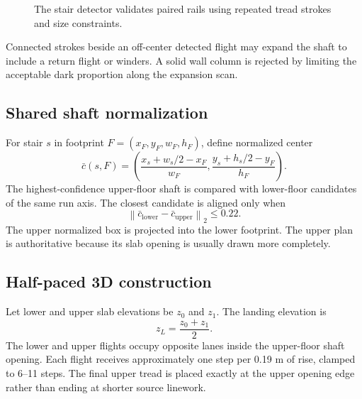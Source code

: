 \documentclass[11pt,a4paper]{article}
\newcommand{\norm}[1]{\left\lVert #1\right\rVert}
\begin{document}
\begin{figure}[htbp]
\centering
{}
\caption{The stair detector validates paired rails using repeated tread strokes and size constraints.}
\label{fig:stairdetect}
\end{figure}

Connected strokes beside an off-center detected flight may expand the shaft to include a return flight or winders. A solid wall column is rejected by limiting the acceptable dark proportion along the expansion scan.

\subsection{Shared shaft normalization}

For stair $s$ in footprint $F=(x_F,y_F,w_F,h_F)$, define normalized center
\begin{equation}
\bar c(s,F)=\left(\frac{x_s+w_s/2-x_F}{w_F},\frac{y_s+h_s/2-y_F}{h_F}\right).
\end{equation}
The highest-confidence upper-floor shaft is compared with lower-floor candidates of the same run axis. The closest candidate is aligned only when
\begin{equation}
\norm{\bar c_{\text{lower}}-\bar c_{\text{upper}}}_2\leq0.22.
\end{equation}
The upper normalized box is projected into the lower footprint. The upper plan is authoritative because its slab opening is usually drawn more completely.

\subsection{Half-paced 3D construction}

Let lower and upper slab elevations be $z_0$ and $z_1$. The landing elevation is
\begin{equation}
z_L=\frac{z_0+z_1}{2}.
\end{equation}
The lower and upper flights occupy opposite lanes inside the upper-floor shaft opening. Each flight receives approximately one step per 0.19 m of rise, clamped to 6--11 steps. The final upper tread is placed exactly at the upper opening edge rather than ending at shorter source linework.
\end{document}
